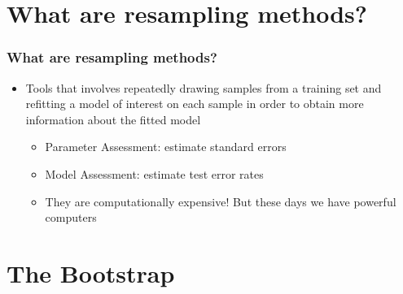 \documentclass[
  shownotes,
  xcolor={svgnames},
  hyperref={colorlinks,citecolor=DarkBlue,linkcolor=andesred,urlcolor=DarkBlue}
  , aspectratio=169]{beamer}
\begin{document}
\section{What are resampling methods?}
\begin{frame}[fragile]
\frametitle{What are resampling methods?}

\begin{itemize}
\item Tools that involves repeatedly drawing samples from a training set and refitting a model of interest on each sample in order to obtain more information about the fitted model
\medskip
\begin{itemize}
  \item Parameter Assessment: estimate standard errors
  \medskip
  \item Model Assessment: estimate test error rates
  \medskip
  \item They are computationally expensive! But these days we have powerful computers
\end{itemize}
\end{itemize}

\end{frame}

\section{The Bootstrap}
\end{document}
